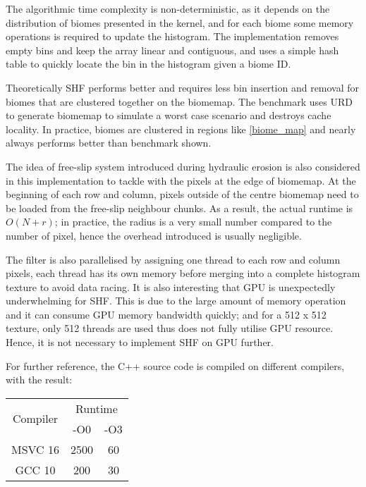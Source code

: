 \documentclass[oneside, a4paper]{report}
\begin{document}
    The algorithmic time complexity is non-deterministic, as it depends on the distribution of biomes presented in the kernel, and for each biome some memory operations is required to update the histogram. The implementation removes empty bins and keep the array linear and contiguous, and uses a simple hash table to quickly locate the bin in the histogram given a biome ID.
    
    Theoretically SHF performs better and requires less bin insertion and removal for biomes that are clustered together on the biomemap. The benchmark uses URD to generate biomemap to simulate a worst case scenario and destroys cache locality. In practice, biomes are clustered in regions like \ref{biome_map} and nearly always performs better than benchmark shown.

    The idea of free-slip system introduced during hydraulic erosion is also considered in this implementation to tackle with the pixels at the edge of biomemap. At the beginning of each row and column, pixels outside of the centre biomemap need to be loaded from the free-slip neighbour chunks. As a result, the actual runtime is \(O(N + r)\); in practice, the radius is a very small number compared to the number of pixel, hence the overhead introduced is usually negligible.

    The filter is also parallelised by assigning one thread to each row and column pixels, each thread has its own memory before merging into a complete histogram texture to avoid data racing. It is also interesting that GPU is unexpectedly underwhelming for SHF. This is due to the large amount of memory operation and it can consume GPU memory bandwidth quickly; and for a 512 x 512 texture, only 512 threads are used thus does not fully utilise GPU resource. Hence, it is not necessary to implement SHF on GPU further.

    For further reference, the C++ source code is compiled on different compilers, with the result:

    \begin{center}
        \begin{tabular}{|c||c|c|}
            \hline
            \multirow{2}{*}{Compiler} & 
            \multicolumn{2}{c|}{Runtime} \\
            & -O0 & -O3 \\
            \hline
            \hline
            MSVC 16 & 2500 & 60 \\
            \hline
            GCC 10 & 200 & 30 \\
            \hline
        \end{tabular}
    \end{center}
\end{document}
